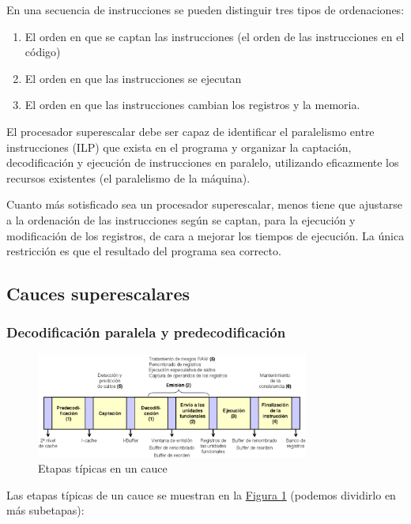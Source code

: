 \documentclass[10pt,a4paper,spanish]{report}
\begin{document}
En una secuencia de instrucciones se pueden distinguir tres tipos de ordenaciones:
\begin{enumerate}[\color{azul}{$\heartsuit$}]
    \item El orden en que se captan las instrucciones (el orden de las instrucciones en el código)
    \item El orden en que las instrucciones se ejecutan
    \item El orden en que las instrucciones cambian los registros y la memoria.
\end{enumerate}

El procesador superescalar debe ser capaz de identificar el paralelismo entre instrucciones (ILP) que exista en el programa y organizar la captación, decodificación y ejecución de instrucciones en paralelo, utilizando eficazmente los recursos existentes (el paralelismo de la máquina).

Cuanto más sotisficado sea un procesador superescalar, menos tiene que ajustarse a la ordenación de las instrucciones según se captan, para la ejecución y modificación de los registros, de cara a mejorar los tiempos de ejecución. La única restricción es que el resultado del programa sea correcto.

\textcolor{azul}{\subsection{Cauces superescalares}}
\textcolor{azul}{\subsubsection{Decodificación paralela y predecodificación}}
\begin{figure}[!h]
\centering
\includegraphics[width=0.8\textwidth]{82}
\caption{Etapas típicas en un cauce}
\label{cauce}
\end{figure}

Las etapas típicas de un cauce se muestran en la \hyperref[cauce]{Figura \ref*{cauce}} (podemos dividirlo en más subetapas):
\end{document}
